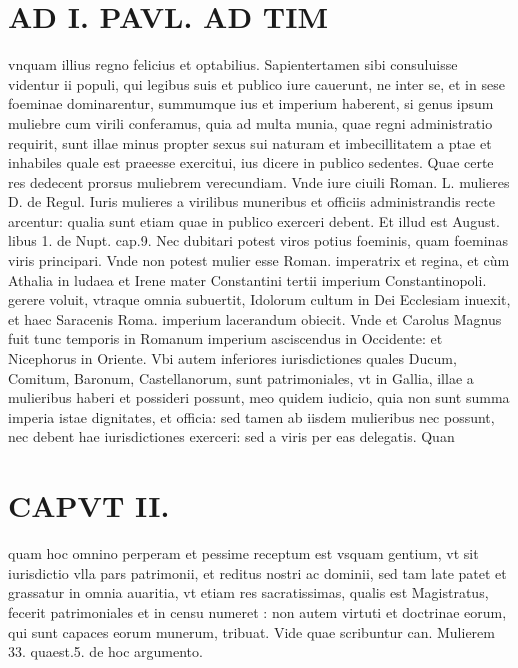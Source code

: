 \documentclass{article}
\begin{document}
\begin{pages}
\section*{AD I. PAVL. AD TIM }
\marginpar{[ p.86 ]}\pstart vnquam illius regno felicius et optabilius. Sapientertamen sibi consuluisse videntur ii populi, qui legibus suis et publico iure cauerunt, ne inter se, et in sese foeminae dominarentur, summumque ius et imperium haberent, si genus ipsum muliebre cum virili conferamus, quia ad multa munia, quae regni administratio requirit, sunt illae minus propter sexus sui naturam et imbecillitatem a ptae et inhabiles quale est praeesse exercitui, ius dicere in publico sedentes. Quae certe res dedecent prorsus muliebrem verecundiam. Vnde iure ciuili Roman. L. mulieres D. de Regul. Iuris mulieres a virilibus muneribus et officiis administrandis recte arcentur: qualia sunt etiam quae in publico exerceri debent. Et illud est August. libus 1. de Nupt. cap.9. Nec dubitari potest viros potius foeminis, quam foeminas viris principari. Vnde non potest mulier esse Roman. imperatrix et regina, et cùm Athalia in ludaea et Irene mater Constantini tertii imperium Constantinopoli. gerere voluit, vtraque omnia subuertit, Idolorum cultum in Dei Ecclesiam inuexit, et haec Saracenis Roma. imperium lacerandum obiecit. Vnde et Carolus Magnus fuit tunc temporis in Romanum imperium asciscendus in Occidente: et Nicephorus in Oriente. Vbi autem inferiores iurisdictiones quales Ducum, Comitum, Baronum, Castellanorum, sunt patrimoniales, vt in Gallia, illae a mulieribus haberi et possideri possunt, meo quidem iudicio, quia non sunt summa imperia istae dignitates, et officia: sed tamen ab iisdem mulieribus nec possunt, nec debent hae iurisdictiones exerceri: sed a viris per eas delegatis. Quan\pend
\section*{CAPVT II. }
\marginpar{[ p.87 ]}\pstart quam hoc omnino perperam et pessime receptum est vsquam gentium, vt sit iurisdictio vlla pars patrimonii, et reditus nostri ac dominii, sed tam late patet et grassatur in omnia auaritia, vt etiam res sacratissimas, qualis est Magistratus, fecerit patrimoniales et in censu numeret : non autem virtuti et doctrinae eorum, qui sunt capaces eorum munerum, tribuat. Vide quae scribuntur can. Mulierem 33. quaest.5. de hoc argumento.  \pend
{}
{}

\end{pages}
\end{document}

